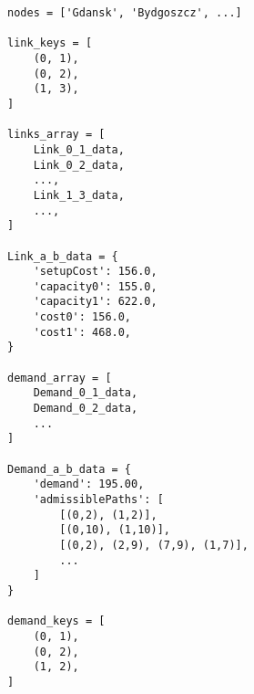 \lstset{language=Python}
\begin{lstlisting}
nodes = ['Gdansk', 'Bydgoszcz', ...]

link_keys = [
    (0, 1),
    (0, 2),
    (1, 3),
]

links_array = [
    Link_0_1_data,
    Link_0_2_data,
    ...,
    Link_1_3_data,
    ...,
]

Link_a_b_data = {
    'setupCost': 156.0,
    'capacity0': 155.0,
    'capacity1': 622.0,
    'cost0': 156.0,
    'cost1': 468.0,
}

demand_array = [
    Demand_0_1_data,
    Demand_0_2_data,
    ...
]

Demand_a_b_data = {
    'demand': 195.00,
    'admissiblePaths': [
        [(0,2), (1,2)],
        [(0,10), (1,10)],
        [(0,2), (2,9), (7,9), (1,7)],
        ...
    ]
}

demand_keys = [
    (0, 1),
    (0, 2),
    (1, 2),
]

\end{lstlisting}